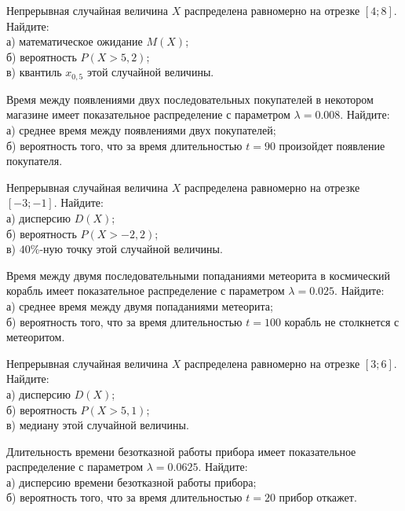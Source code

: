 \vfill

\newpage\setcounter{zad}{0}

\z Непрерывная случайная величина $X$ распределена равномерно на отрезке $[4; 8]$. Найдите: \\ \quad а) математическое ожидание $M(X)$; \\ \quad б) вероятность $P(X>5{,}2)$; \\ \quad в) квантиль $x_{0{,}5}$ этой случайной величины.


\vfill

\z Время между появлениями двух последовательных покупателей в некотором магазине имеет показательное распределение с параметром $\lambda = 0.008$. Найдите: \\ \quad а) среднее время между появлениями двух покупателей; \\ \quad б) вероятность того, что за время длительностью $t = 90$  произойдет появление покупателя.
 

\vfill

\newpage\setcounter{zad}{0}

\z Непрерывная случайная величина $X$ распределена равномерно на отрезке $[-3; -1]$. Найдите: \\ \quad а) дисперсию $D(X)$; \\ \quad б) вероятность $P(X>-2{,}2)$; \\ \quad в) $40\%$-ную точку этой случайной величины.


\vfill

\z Время между двумя последовательными попаданиями метеорита в космический корабль имеет показательное распределение с параметром $\lambda = 0.025$. Найдите: \\ \quad а) среднее время между двумя попаданиями метеорита; \\ \quad б) вероятность того, что за время длительностью $t = 100$ корабль не столкнется с метеоритом.
 

\vfill

\newpage\setcounter{zad}{0}

\z Непрерывная случайная величина $X$ распределена равномерно на отрезке $[3; 6]$. Найдите: \\ \quad а) дисперсию $D(X)$; \\ \quad б) вероятность $P(X>5{,}1)$; \\ \quad в) медиану этой случайной величины.


\vfill

\z Длительность времени безотказной работы прибора имеет показательное распределение с параметром $\lambda = 0.0625$. Найдите: \\ \quad а) дисперсию времени безотказной работы прибора; \\ \quad б) вероятность того, что за время длительностью $t = 20$ прибор  откажет.
 

